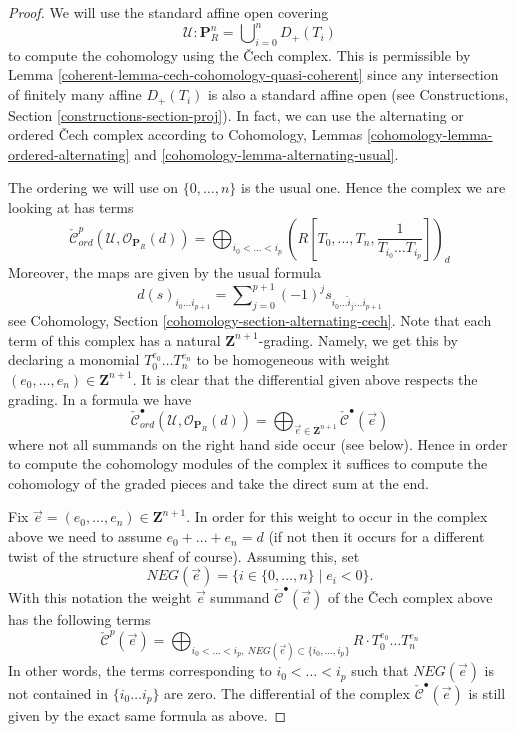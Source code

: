 \begin{proof}

We will use the standard affine open covering
$$
\mathcal{U} : \mathbf{P}^n_R = \bigcup\nolimits_{i = 0}^n D_{+}(T_i)
$$
to compute the cohomology using the {\v C}ech complex.
This is permissible by Lemma \ref{coherent-lemma-cech-cohomology-quasi-coherent}
since any intersection of finitely many affine $D_{+}(T_i)$ is also a
standard affine open (see
Constructions, Section \ref{constructions-section-proj}).
In fact, we can use the alternating or ordered {\v C}ech complex according to
Cohomology, Lemmas \ref{cohomology-lemma-ordered-alternating} and
\ref{cohomology-lemma-alternating-usual}.

\medskip\noindent
The ordering we will use on $\{0, \ldots, n\}$ is the usual one.
Hence the complex we are looking at has terms
$$
\check{\mathcal{C}}_{ord}^p(\mathcal{U}, \mathcal{O}_{\mathbf{P}_R}(d))
=
\bigoplus\nolimits_{i_0 < \ldots < i_p}
(R[T_0, \ldots, T_n, \frac{1}{T_{i_0} \ldots T_{i_p}}])_d
$$
Moreover, the maps are given by the usual formula
$$
d(s)_{i_0 \ldots i_{p + 1}} =
\sum\nolimits_{j = 0}^{p + 1} (-1)^j s_{i_0 \ldots \hat i_j \ldots i_{p + 1}}
$$
see Cohomology, Section \ref{cohomology-section-alternating-cech}.
Note that each term of this complex has a natural
$\mathbf{Z}^{n + 1}$-grading. Namely, we get this by declaring a monomial
$T_0^{e_0} \ldots T_n^{e_n}$ to be homogeneous with weight
$(e_0, \ldots, e_n) \in \mathbf{Z}^{n + 1}$. It is clear that the differential
given above respects the grading. In a formula we have
$$
\check{\mathcal{C}}_{ord}^\bullet(\mathcal{U}, \mathcal{O}_{\mathbf{P}_R}(d))
=
\bigoplus\nolimits_{\vec{e} \in \mathbf{Z}^{n + 1}}
\check{\mathcal{C}}^\bullet(\vec{e})
$$
where not all summands on the right hand side occur (see below).
Hence in order to compute the cohomology
modules of the complex it suffices to compute the cohomology of the graded
pieces and take the direct sum at the end.

\medskip\noindent
Fix $\vec{e} = (e_0, \ldots, e_n) \in \mathbf{Z}^{n + 1}$. In order for this
weight to occur in the complex above we need to assume
$e_0 + \ldots + e_n = d$ (if not then it occurs for a different twist of
the structure sheaf of course). Assuming this, set
$$
NEG(\vec{e}) = \{i \in \{0, \ldots, n\} \mid e_i < 0\}.
$$
With this notation the weight $\vec{e}$ summand
$\check{\mathcal{C}}^\bullet(\vec{e})$ of the {\v C}ech complex above has
the following terms
$$
\check{\mathcal{C}}^p(\vec{e})
=
\bigoplus\nolimits_{i_0 < \ldots < i_p,
\ NEG(\vec{e}) \subset \{i_0, \ldots, i_p\}}
R \cdot T_0^{e_0} \ldots T_n^{e_n}
$$
In other words, the terms corresponding to $i_0 < \ldots < i_p$ such
that $NEG(\vec{e})$ is not contained in $\{i_0 \ldots i_p\}$ are zero.
The differential of the complex $\check{\mathcal{C}}^\bullet(\vec{e})$
is still given by the exact same formula as above.


\end{proof}
